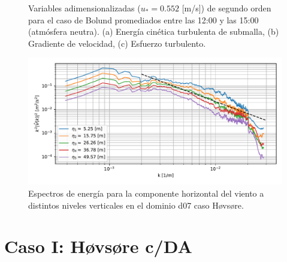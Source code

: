 \begin{figure}[H]
\begin{center}
	\end{center}
	\caption{Variables adimensionalizadas ($u_* = 0.552$ [m/s]) de segundo orden para el caso de Bolund promediados entre las 12:00 y las 15:00 (atmósfera neutra). (a) Energía cinética turbulenta de submalla, (b) Gradiente de velocidad, (c) Esfuerzo turbulento. }
	\label{fig:06_hov_mean_secondorder}
\end{figure}

\begin{figure}[H]
	\centering
	\includegraphics[width=1.0\linewidth,page=1,trim={3mm 5mm 3mm 3mm},clip]{Imagenes/06/hov/spectra}%
	\caption{Espectros de energía para la componente horizontal del viento a distintos niveles verticales en el dominio d07 caso Høvsøre.}
	\label{fig:06_hov_spectrum}
\end{figure}

\section{Caso I: Høvsøre c/DA}

